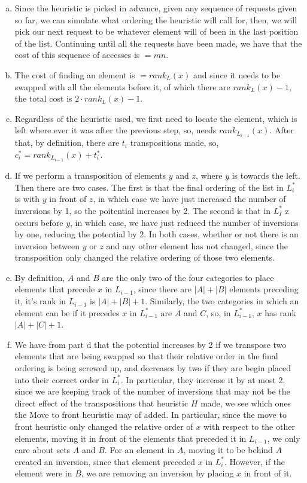 \documentclass{article}
\begin{document}
\begin{enumerate}[a.]
\item 
Since the heuristic is picked in advance, given any sequence of requests given so far, we can simulate what ordering the heuristic will call for, then, we will pick our next request to be whatever element will of been in the last position of the list. Continuing until all the requests have been made, we have that the cost of this sequence of accesses is $=mn$.

\item
The cost of finding an element is $=rank_L(x)$ and since it needs to be swapped with all the elements before it, of which there are $rank_L(x)-1$, the total cost is $2\cdot rank_L(x)-1$.

\item
Regardless of the heuristic used, we first need to locate the element, which is left where ever it was after the previous step, so, needs $rank_{L_{i-1}}(x)$. After that, by definition, there are $t_i$ transpositions made, so, $c_i^* = rank_{L_{i-1}}(x) + t_i^*$.

\item
If we perform a transposition of elements $y$ and $z$, where $y$ is towards the left. Then there are two cases. The first is that the final ordering of the list in $L_i^*$ is with $y$ in front of $z$, in which case we have just increased the number of inversions by 1, so the poitential increases by 2. The second is that in $L_I^*$ z occurs before $y$, in which case, we have just reduced the number of inversions by one, reducing the potential by 2. In both cases, whether or not there is an inversion between $y$ or $z$ and any other element has not changed, since the transposition only changed the relative ordering of those two elements.

\item
By definition, $A$ and $B$ are the only two of the four categories to place elements that precede $x$ in $L_{i-1}$, since there are $|A|+|B|$ elements preceding it, it's rank in $L_{i-1}$ is $|A|+|B|+1$. Similarly, the two categories in which an element can be if it precedes $x$ in $L_{i-1}^*$ are $A$ and $C$, so, in $L_{i-1}^*$, $x$ has rank $|A|+|C|+1$.

\item
We have from part d that the potential increases by 2 if we transpose two elements that are being swapped so that their relative order in the final ordering is being screwed up, and decreases by two if they are begin placed into their correct order in $L_i^*$. In particular, they increase it by at most 2. since we are keeping track of the number of inversions that may not be the direct effect of the transpositions that heuristic $H$ made, we see which ones the Move to front heuristic may of added. In particular, since the move to front heuristic only changed the relative order of $x$ with respect to the other elements, moving it in front of the elements that preceded it in $L_{i-1}$, we only care about sets $A$ and $B$. For an element in $A$, moving it to be behind $A$ created an inversion, since that element preceded $x$ in $L_i^*$. However, if the element were in $B$, we are removing an inversion by placing $x$ in front of it.


\end{enumerate}
\end{document}
